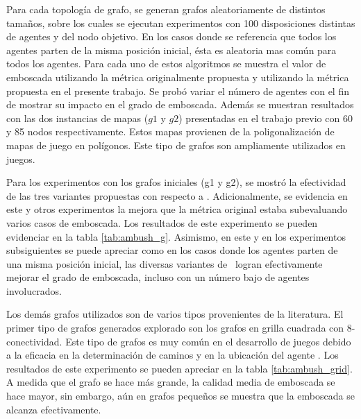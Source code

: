 Para cada topolog\'ia de grafo, se generan grafos aleatoriamente de distintos
tamaños, sobre los cuales se ejecutan experimentos con 100 disposiciones
distintas de agentes y del nodo objetivo. En los casos donde se referencia
que todos los agentes parten de la misma posici\'on inicial, \'esta es
aleatoria mas com\'un para todos los agentes.
Para cada uno de estos algoritmos se muestra el valor de emboscada
utilizando la m\'etrica originalmente propuesta y utilizando la
m\'etrica propuesta en el presente trabajo. Se prob\'o variar el
n\'umero de agentes con el fin de mostrar su impacto en el grado de emboscada.
Adem\'as se muestran resultados con las dos instancias de mapas ($g1$ y $g2$)
presentadas en el trabajo previo \cite{FGC12} con 60 y 85 nodos
respectivamente. Estos mapas provienen de la poligonalizaci\'on de mapas
de juego en pol\'igonos. Este tipo de grafos son ampliamente utilizados
en juegos\cite{MF09}.



Para los experimentos con los grafos iniciales (g1 y g2), se mostr\'o
la efectividad de las tres variantes propuestas con respecto a \astar.
Adicionalmente, se evidencia en este y otros experimentos la mejora
que la m\'etrica original estaba subevaluando varios casos de emboscada.
Los resultados de este experimento se pueden evidenciar en la tabla
\ref{tab:ambush_g}. Asimismo, en este y en los experimentos subsiguientes
se puede apreciar como en los casos donde los agentes parten de una misma
posici\'on inicial, las diversas variantes de \ambush\ logran efectivamente
mejorar el grado de emboscada, incluso con un n\'umero bajo de agentes
involucrados.



Los dem\'as grafos utilizados son de varios tipos provenientes de la
literatura. El primer tipo de grafos generados explorado son los grafos
en grilla cuadrada con 8-conectividad. Este tipo de grafos es muy com\'un en el
desarrollo de juegos debido a la eficacia en la determinaci\'on de caminos
y en la ubicaci\'on del agente \cite{MF09}.
Los resultados de este experimento se pueden apreciar en la tabla
\ref{tab:ambush_grid}. A medida que el grafo se hace m\'as grande, la
calidad media de emboscada se hace mayor, sin embargo, a\'un en grafos
pequeños se muestra que la emboscada se alcanza efectivamente.





